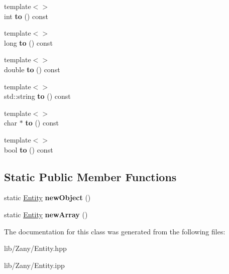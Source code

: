 \begin{DoxyCompactItemize}
\item 
\mbox{\label{classzany_1_1_entity_a26594f38171700d5f00d4770bc8056e1}} 
{\footnotesize template$<$$>$ }\\int {\bfseries to} () const
\item 
\mbox{\label{classzany_1_1_entity_a38cba4eaebbb8f358d47952ed96d615b}} 
{\footnotesize template$<$$>$ }\\long {\bfseries to} () const
\item 
\mbox{\label{classzany_1_1_entity_a52abac40f3107b9cfca3b2812a03e716}} 
{\footnotesize template$<$$>$ }\\double {\bfseries to} () const
\item 
\mbox{\label{classzany_1_1_entity_a644c78dd43e8436180c00b4ffc156f67}} 
{\footnotesize template$<$$>$ }\\std\+::string {\bfseries to} () const
\item 
\mbox{\label{classzany_1_1_entity_a19a9eafff1b66ac2f3f8c576e988cef8}} 
{\footnotesize template$<$$>$ }\\char $\ast$ {\bfseries to} () const
\item 
\mbox{\label{classzany_1_1_entity_a0a627b6067bb23265a6bbca33ecc91db}} 
{\footnotesize template$<$$>$ }\\bool {\bfseries to} () const
\end{DoxyCompactItemize}
\subsection*{Static Public Member Functions}
\begin{DoxyCompactItemize}
\item 
\mbox{\label{classzany_1_1_entity_a4541ff5e1ea9c88fced737969bb3eee3}} 
static \hyperlink{classzany_1_1_entity}{Entity} {\bfseries new\+Object} ()
\item 
\mbox{\label{classzany_1_1_entity_ac8124bc94f4c051fb58afe5de96189e6}} 
static \hyperlink{classzany_1_1_entity}{Entity} {\bfseries new\+Array} ()
\end{DoxyCompactItemize}


The documentation for this class was generated from the following files\+:\begin{DoxyCompactItemize}
\item 
lib/\+Zany/Entity.\+hpp\item 
lib/\+Zany/Entity.\+ipp\end{DoxyCompactItemize}
